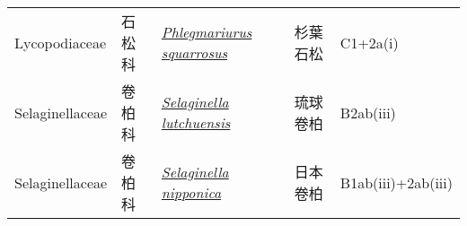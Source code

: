 {\begin{longtable}{L{2.5cm}L{2cm}L{5cm}L{2.5cm}L{3cm}}
    Lycopodiaceae & 石松科 & \href{http://www.theplantlist.org/tpl1.1/search?q=Phlegmariurus+squarrosus}{\textit{Phlegmariurus squarrosus} } & 杉葉石松 & C1+2a(i)    \\
    Selaginellaceae & 卷柏科 & \href{http://www.theplantlist.org/tpl1.1/search?q=Selaginella+lutchuensis}{\textit{Selaginella lutchuensis} } & 琉球卷柏 & B2ab(iii)    \\
    Selaginellaceae & 卷柏科 & \href{http://www.theplantlist.org/tpl1.1/search?q=Selaginella+nipponica}{\textit{Selaginella nipponica} } & 日本卷柏 & B1ab(iii)+2ab(iii)    \\
    \bottomrule
        \end{longtable}
        }
    